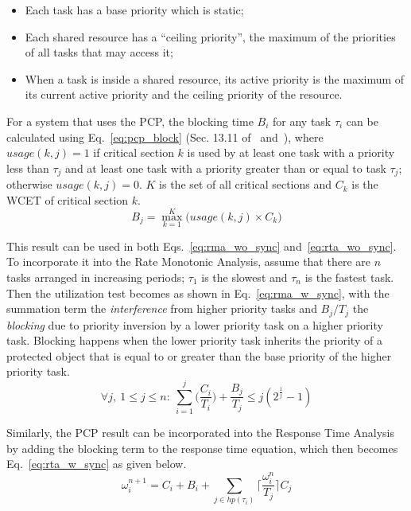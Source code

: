 \begin{itemize}
\item{Each task has a base priority which is static;}
\item{Each shared resource has a ``ceiling priority'', the maximum of
  the priorities of all tasks that may access it;}
\item{When a task is inside a shared resource, its active priority is
  the maximum of its current active priority and the ceiling priority
  of the resource.}
\end{itemize}

For a system that uses the PCP, the blocking time $B_i$ for any task
$\tau_i$ can be calculated using Eq.~\ref{eq:pcp_block} (Sec. 13.11
of~\cite{burns-rtspl} and~\cite{sha@toc90}), where $usage(k, j) = 1$
if critical section $k$ is used by at least one task with a priority
less than $\tau_j$ and at least one task with a priority greater than
or equal to task $\tau_j$; otherwise $usage(k, j) = 0$. $K$ is the set
of all critical sections and $C_k$ is the WCET of critical section
$k$.
\begin{equation}
\label{eq:pcp_block}
B_j = \max_{k=1}^{K} \Big(usage(k,j)\times C_k\Big)
\end{equation}

This result can be used in both Eqs.~\ref{eq:rma_wo_sync}
and~\ref{eq:rta_wo_sync}. To incorporate it into the Rate Monotonic
Analysis, assume that there are $n$ tasks arranged in increasing
periods; $\tau_1$ is the slowest and $\tau_n$ is the fastest
task. Then the utilization test becomes as shown in
Eq.~\ref{eq:rma_w_sync}, with the summation term the
\emph{interference} from higher priority tasks and $B_j/T_j$ the
\emph{blocking} due to priority inversion by a lower priority task on
a higher priority task. Blocking happens when the lower priority task
inherits the priority of a protected object that is equal to or
greater than the base priority of the higher priority task.
\begin{equation}
\label{eq:rma_w_sync}
\forall j,\ 1 \le j \le n:\ \sum_{i=1}^j
\bigg(\frac{C_i}{T_i}\bigg)+\frac{B_j}{T_j} \le j(2^{\frac{1}{j}}-1)
\end{equation}

Similarly, the PCP result can be incorporated into the Response Time
Analysis by adding the blocking term to the response time equation,
which then becomes Eq.~\ref{eq:rta_w_sync} as given below.
\begin{equation}
\label{eq:rta_w_sync}
\omega_i^{n+1}=C_i + B_i + \sum_{j \in hp(\tau_i)}
\bigg\lceil\frac{\omega_i^n}{T_j}\bigg\rceil C_j
\end{equation}

